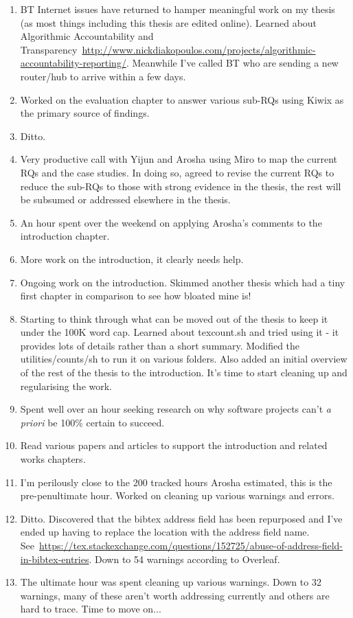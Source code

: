 \begin{enumerate}
    \item BT Internet issues have returned to hamper meaningful work on my thesis (as most things including this thesis are edited online). Learned about Algorithmic Accountability and Transparency~\url{http://www.nickdiakopoulos.com/projects/algorithmic-accountability-reporting/}. Meanwhile I've called BT who are sending a new router/hub to arrive within a few days.
    \item Worked on the evaluation chapter to answer various sub-RQs using Kiwix as the primary source of findings.
    \item Ditto.
    \item Very productive call with Yijun and Arosha using Miro to map the current RQs and the case studies. In doing so, agreed to revise the current RQs to reduce the sub-RQs to those with strong evidence in the thesis, the rest will be subsumed or addressed elsewhere in the thesis.
    \item An hour spent over the weekend on applying Arosha's comments to the introduction chapter. 
    \item More work on the introduction, it clearly needs help.
    \item Ongoing work on the introduction. Skimmed another thesis which had a tiny first chapter in comparison to see how bloated mine is!
    \item Starting to think through what can be moved out of the thesis to keep it under the 100K word cap. Learned about texcount.sh and tried using it - it provides lots of details rather than a short summary. Modified the utilities/counts/sh to run it on various folders. Also added an initial overview of the rest of the thesis to the introduction. It's time to start cleaning up and regularising the work.
    \item Spent well over an hour seeking research on why software projects can't \emph{a priori} be 100\% certain to succeed.
    \item Read various papers and articles to support the introduction and related works chapters.
    \item I'm perilously close to the 200 tracked hours Arosha estimated, this is the pre-penultimate hour. Worked on cleaning up various warnings and errors.
    \item Ditto. Discovered that the bibtex address field has been repurposed and I've ended up having to replace the location with the address field name. See~\url{https://tex.stackexchange.com/questions/152725/abuse-of-address-field-in-bibtex-entries}. Down to 54 warnings according to Overleaf.
    \item The ultimate hour was spent cleaning up various warnings. Down to 32 warnings, many of these aren't worth addressing currently and others are hard to trace. Time to move on...
\end{enumerate}

